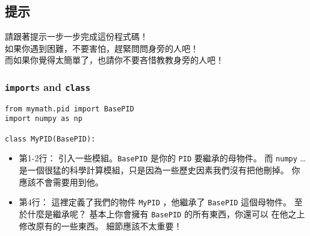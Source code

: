 \documentclass[12pt, a4paper]{article}
\begin{document}
\subsection{提示}
請跟著提示一步一步完成這份程式碼！\\
如果你遇到困難，不要害怕，趕緊問問身旁的人吧！\\
而如果你覺得太簡單了，也請你不要吝惜教教身旁的人吧！
\subsubsection{\texttt{import}s and \texttt{class}}
\begin{verbatim}
from mymath.pid import BasePID
import numpy as np

class MyPID(BasePID):
\end{verbatim}
\begin{itemize}
  \itemsep=0pt
  \item 第1-2行： 引入一些模組。\texttt{BasePID} 是你的 
    \texttt{PID} 要繼承的母物件。 而 \texttt{numpy}
    …是一個很猛的科學計算模組，只是因為一些歷史因素我們沒有把他刪掉。
    你應該不會需要用到他。
  \item 第4行：
    這裡定義了我們的物件 \texttt{MyPID} ，他繼承了 
    \texttt{BasePID} 這個母物件。 至於什麼是繼承呢？
    基本上你會擁有 \texttt{BasePID} 的所有東西，你還可以
    在他之上修改原有的一些東西。 細節應該不太重要！

\end{itemize}
\end{document}
